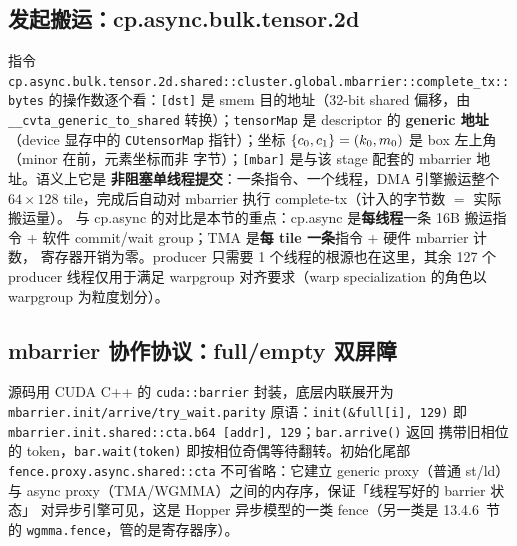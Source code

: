 \subsection{发起搬运：cp.async.bulk.tensor.2d}



指令 \texttt{cp.\allowbreak{}async.\allowbreak{}bulk.\allowbreak{}tensor.2d.\allowbreak{}shared::\allowbreak{}cluster.\allowbreak{}global.\allowbreak{}mbarrier::\allowbreak{}complete\_\allowbreak{}tx::\allowbreak{}bytes}
的操作数逐个看：\texttt{[dst]} 是 smem 目的地址（32-bit shared 偏移，由
\texttt{\_\allowbreak{}\_\allowbreak{}cvta\_\allowbreak{}generic\_\allowbreak{}to\_\allowbreak{}shared} 转换）；\texttt{tensorMap} 是 descriptor 的
\textbf{generic 地址}（device 显存中的 \texttt{CUtensorMap} 指针）；坐标
$\{c\sb{0}, c\sb{1}\} = (k\sb{0}, m\sb{0})$ 是 box 左上角（minor 在前，元素坐标而非
字节）；\texttt{[mbar]} 是与该 stage 配套的 mbarrier 地址。语义上它是
\textbf{非阻塞单线程提交}：一条指令、一个线程，DMA 引擎搬运整个 $64 \times 128$
tile，完成后自动对 mbarrier 执行 complete-tx（计入的字节数 $=$ 实际搬运量）。
与 cp.async 的对比是本节的重点：cp.async 是\textbf{每线程}一条 16B 搬运指令 +
软件 commit/wait group；TMA 是\textbf{每 tile 一条}指令 + 硬件 mbarrier 计数，
寄存器开销为零。producer 只需要 1 个线程的根源也在这里，其余 127 个 producer
线程仅用于满足 warpgroup 对齐要求（warp specialization 的角色以 warpgroup 为粒度划分）。

\subsection{mbarrier 协作协议：full/empty 双屏障}



源码用 CUDA C++ 的 \texttt{cuda::\allowbreak{}barrier} 封装，底层内联展开为
\texttt{mbarrier.\allowbreak{}init/\allowbreak{}arrive/\allowbreak{}try\_\allowbreak{}wait.\allowbreak{}parity} 原语：\texttt{init\allowbreak{}(\&full[i],\allowbreak{} 129)}
即 \texttt{mbarrier.\allowbreak{}init.\allowbreak{}shared::\allowbreak{}cta.\allowbreak{}b64 [addr],\allowbreak{} 129}；\texttt{bar.\allowbreak{}arrive\allowbreak{}()} 返回
携带旧相位的 token，\texttt{bar.\allowbreak{}wait\allowbreak{}(token)} 即按相位奇偶等待翻转。初始化尾部
\texttt{fence.\allowbreak{}proxy.\allowbreak{}async.\allowbreak{}shared::\allowbreak{}cta} 不可省略：它建立 generic proxy（普通
st/ld）与 async proxy（TMA/WGMMA）之间的内存序，保证「线程写好的 barrier 状态」
对异步引擎可见，这是 Hopper 异步模型的一类 fence（另一类是 13.4.6~节的
\texttt{wgmma.fence}，管的是寄存器序）。

